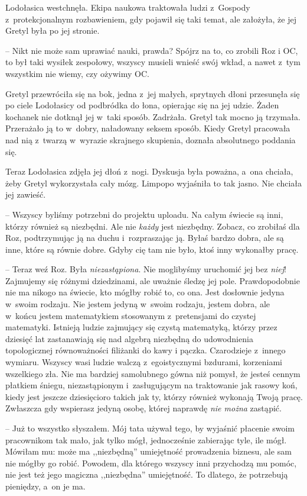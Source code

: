 \documentclass[oneside,polish,11pt,sfheadings]{mwbk}
\begin{document}
Lodołasica westchnęła. Ekipa naukowa traktowała ludzi z~Gospody z~protekcjonalnym rozbawieniem, gdy pojawił się taki temat, ale założyła,
że jej Gretyl była po jej stronie.

-- Nikt nie może sam uprawiać nauki, prawda? Spójrz na to, co zrobili Roz
i OC, to był taki wysiłek zespołowy, wszyscy musieli wnieść swój wkład,
a nawet z~tym wszystkim nie wiemy, czy ożywimy OC.

Gretyl przewróciła się na bok, jedna z~jej małych, sprytnych dłoni
przesunęła się po ciele Lodołasicy od podbródka do łona, opierając się
na jej udzie. Żaden kochanek nie dotknął jej w~taki sposób. Zadrżała.
Gretyl tak mocno ją trzymała. Przerażało ją to w~dobry, naładowany
seksem sposób. Kiedy Gretyl pracowała nad nią z~twarzą w~wyrazie
skrajnego skupienia, doznała absolutnego poddania się.

Teraz Lodołasica zdjęła jej dłoń z~nogi. Dyskusja była poważna, a~ona
chciała, żeby Gretyl wykorzystała cały mózg. Limpopo wyjaśniła to tak
jasno. Nie chciała jej zawieść.

-- Wszyscy byliśmy potrzebni do projektu uploadu. Na całym świecie są
inni, którzy również są niezbędni. Ale nie \textit{każdy} jest niezbędny.
Zobacz, co zrobiłaś dla Roz, podtrzymując ją na duchu i~rozpraszając ją.
Byłaś bardzo dobra, ale są inne, które są równie dobre. Gdyby cię tam
nie było, ktoś inny wykonałby pracę.

-- Teraz weź Roz. Była \textit{niezastąpiona}. Nie moglibyśmy uruchomić jej
bez \textit{niej}! Zajmujemy się różnymi dziedzinami, ale uważnie śledzę
jej pole. Prawdopodobnie nie ma nikogo na świecie, kto mógłby robić to,
co ona. Jest dosłownie jedyna w~swoim rodzaju. Nie jestem jedyną w~swoim
rodzaju, jestem dobra, ale w~końcu jestem matematykiem stosowanym z~pretensjami do czystej matematyki. Istnieją ludzie zajmujący się czystą
matematyką, którzy przez dziesięć lat zastanawiają się nad algebrą
niezbędną do udowodnienia topologicznej równoważności filiżanki do kawy
i pączka. Czarodzieje z~innego wymiaru. Wszyscy wasi ludzie walczą z~egoistycznymi bzdurami, korzeniami wszelkiego zła. Nie ma bardziej
samolubnego gówna niż pomysł, że jesteś cennym płatkiem śniegu,
niezastąpionym i~zasługującym na traktowanie jak rasowy koń, kiedy jest
jeszcze dziesięcioro takich jak ty, którzy również wykonają Twoją pracę.
Zwłaszcza gdy wspierasz jedyną osobę, której naprawdę \textit{nie można}
zastąpić.

-- Już to wszystko słyszałem. Mój tata używał tego, by wyjaśnić płacenie
swoim pracownikom tak mało, jak tylko mógł, jednocześnie zabierając
tyle, ile mógł. Mówiłam mu: może ma ,,niezbędną'' umiejętność
prowadzenia biznesu, ale sam nie mógłby go robić. Powodem, dla którego
wszyscy inni przychodzą mu pomóc, nie jest też jego magiczna
,,niezbędna'' umiejętność. To dlatego, że potrzebują pieniędzy, a~on je
ma.
\end{document}
